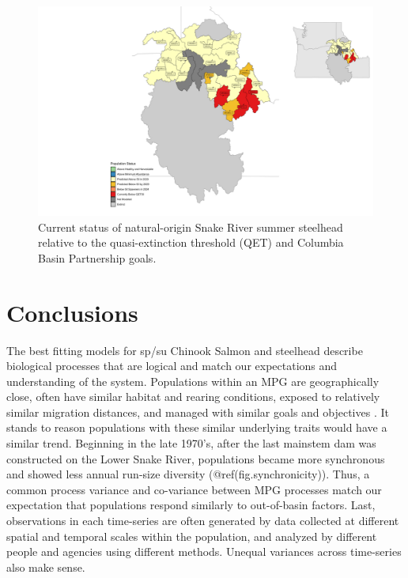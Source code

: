 \documentclass[10pt,a4paper]{article}
\begin{document}
\begin{figure}
\includegraphics[width=1\linewidth]{../figures/Steelhead/Steelhead_map_2024} \caption{Current status of natural-origin Snake River summer steelhead relative to the quasi-extinction threshold (QET) and Columbia Basin Partnership goals.}\label{fig:sth-qet-map}
\end{figure}

\section{Conclusions}\label{conclusions}

The best fitting models for sp/su Chinook Salmon and steelhead describe biological processes that are logical and match our expectations and understanding of the system. Populations within an MPG are geographically close, often have similar habitat and rearing conditions, exposed to relatively similar migration distances, and managed with similar goals and objectives \autocite{copeland_how_2024}. It stands to reason populations with these similar underlying traits would have a similar trend. Beginning in the late 1970's, after the last mainstem dam was constructed on the Lower Snake River, populations became more synchronous and showed less annual run-size diversity (@ref(fig.synchronicity)). Thus, a common process variance and co-variance between MPG processes match our expectation that populations respond similarly to out-of-basin factors. Last, observations in each time-series are often generated by data collected at different spatial and temporal scales within the population, and analyzed by different people and agencies using different methods. Unequal variances across time-series also make sense.
\end{document}
